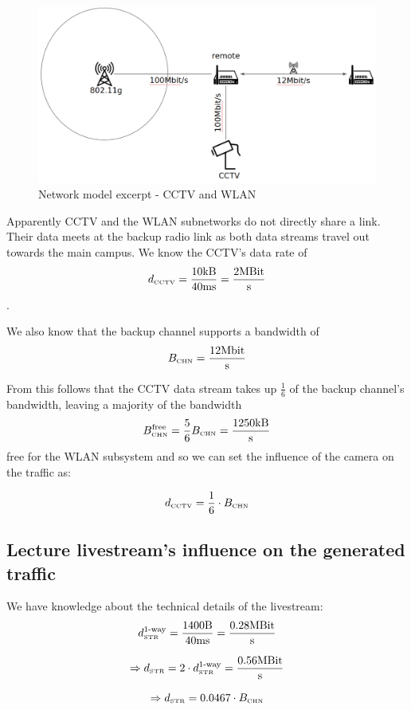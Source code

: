 \documentclass[a4paper]{scrreprt}
\begin{document}
			\begin{figure}[H]
				\center\includegraphics[width=\textwidth]{./simmodel_cctv_vs_wlan.png}
				\caption{Network model excerpt - CCTV and WLAN}
			\end{figure}
			
			Apparently CCTV and the WLAN subnetworks do not directly share a link. Their data meets at the backup radio link as both data streams travel out towards the main campus. We know the CCTV's data rate of  
			\[d_\text{\tiny CCTV}=\frac{10\text{kB}}{40\text{ms}}=\frac{2\text{MBit}}{\text{s}}\]. 
			
			We also know that the backup channel supports a bandwidth of \[B_\text{\tiny CHN}=\frac{12\text{Mbit}}{\text{s}}\]
			
			From this follows that the CCTV data stream takes up $\frac{1}{6}$ of the backup channel's bandwidth, leaving a majority of the bandwidth \[B_\text{\tiny CHN}^\text{free}=\frac{5}{6} B_\text{\tiny CHN}=\frac{1250\text{kB}}{\text{s}}\] free for the WLAN subsystem and so we can set the influence of the camera on the traffic as:
			
			\[d_\text{\tiny CCTV}=\frac{1}{6}\cdot B_\text{\tiny CHN}\]
		
			\subsection{Lecture livestream's influence on the generated traffic}
			We have knowledge about the technical details of the livestream: 
		\[d_\text{\tiny STR}^\text{1-way}=\frac{1400\text{B}}{40\text{ms}}=\frac{0.28\text{MBit}}{\text{s}}\]
		
			\[\Rightarrow d_\text{\tiny STR}=2\cdot d_\text{\tiny STR}^\text{1-way}=\frac{0.56\text{MBit}}{\text{s}}\]
			
			\[\Rightarrow d_\text{\tiny STR}=0.0467\cdot B_\text{\tiny CHN}\]
			
\end{document}
